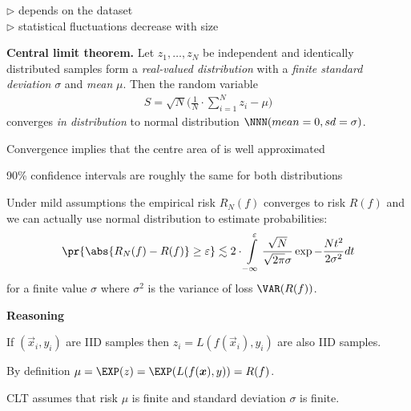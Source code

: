 \documentclass[landscape,footrule]{foils}
\begin{document}
\vspace*{-0.0cm}
$\triangleright$  depends on the dataset\\
$\triangleright$  statistical fluctuations decrease with size




\textbf{Central limit theorem.}
Let $z_1, \ldots, z_N$ be independent and identically distributed samples form a \emph{real-valued distribution} with a \emph{finite standard deviation} $\sigma$ and \emph{mean} $\mu$. Then the random variable 
\begin{align*}
S=\sqrt{N}\Biggl(\frac{1}{N}\cdot \sum_{i=1}^N z_i -\mu\Biggr)
\end{align*}
converges \emph{in distribution} to normal distribution $\NNN(mean=0, sd=\sigma)$.  




\vspace*{-0.5cm}

Convergence implies that the centre area of is well approximated 
\begin{triangles}
\item 90\% confidence intervals are roughly the same for both distributions
\end{triangles}




Under mild assumptions the empirical risk $R_N(f)$ converges to risk $R(f)$ and we can actually use normal distribution to estimate probabilities:
\begin{align*}
\pr{\abs{R_N(f)-R(f)}\geq \varepsilon} \lesssim 2\cdot \int\limits_{-\infty}^\varepsilon\frac{\sqrt{N}}{\sqrt{2\pi}\sigma}\exp{-\frac{N t^2}{2 \sigma^2}}dt
\end{align*}
for a finite value $\sigma$ where $\sigma^2$ is the variance of loss $\VAR(R(f))$.
\vspace*{1cm}

\textbf{Reasoning}
\begin{triangles}
\item If $(\vec{x}_i, y_i)$ are IID samples then $z_i=L(f(\vec{x}_i), y_i)$ are also IID samples.
\item By definition $\mu=\EXP(z)=\EXP(L(f(\vec{x}),y))=R(f)$.
\item CLT assumes that risk $\mu$ is finite and standard deviation $\sigma$ is finite.
\end{triangles}
\bigskip
\end{document}
